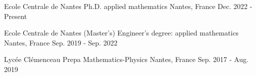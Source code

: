 

\begin{cvcompactentries}



\cvcompactentry
{Ecole Centrale de Nantes} %
{Ph.D. applied mathematics} %
{Nantes, France} %
{Dec. 2022 - Present} %
{}


\cvcompactentry
{Ecole Centrale de Nantes} %
{(Master's) Engineer's degree: applied mathematics} %
{Nantes, France} %
{Sep. 2019 - Sep. 2022} %
{}


\cvcompactentry
{Lycée Clémenceau} %
{Prepa Mathematics-Physics} %
{Nantes, France} %
{Sep. 2017 - Aug. 2019} %
{}


\end{cvcompactentries}
